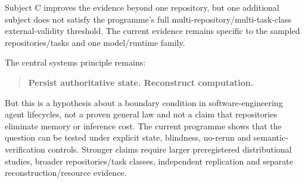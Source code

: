 Subject C improves the evidence beyond one repository, but one additional subject does not satisfy the programme's full multi-repository/multi-task-class external-validity threshold. The current evidence remains specific to the sampled repositories/tasks and one model/runtime family.

The central systems principle remains:
\begin{quote}
\textbf{Persist authoritative state. Reconstruct computation.}
\end{quote}

But this is a hypothesis about a boundary condition in software-engineering agent lifecycles, not a proven general law and not a claim that repositories eliminate memory or inference cost. The current programme shows that the question can be tested under explicit state, blindness, no-rerun and semantic-verification controls. Stronger claims require larger preregistered distributional studies, broader repositories/task classes, independent replication and separate reconstruction/resource evidence.

